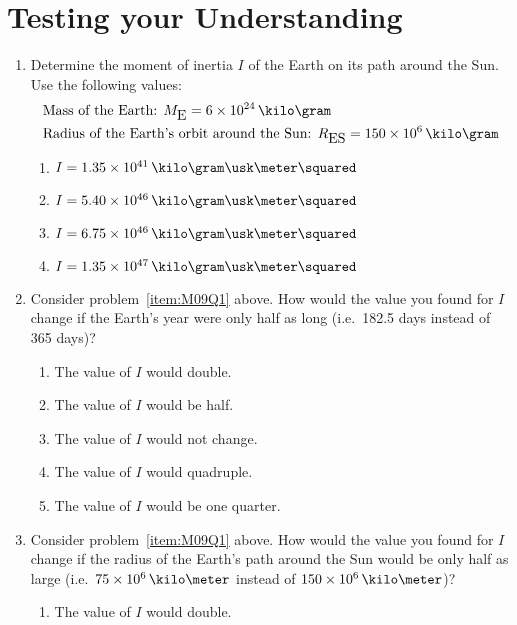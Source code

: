 
\section{Testing your Understanding}

\begin{enumerate}
\item \label{item:M09Q1} Determine the moment of inertia $I$ of the Earth on its path around the Sun. Use the following values:
  \begin{align*} %
    & \text{Mass of the Earth: } M_{\mbox{E}} = 6 \times 10^{24}\,\kilo\gram\\
    & \text{Radius of the Earth's orbit around the Sun: } R_{\mbox{ES}} = 150 \times 10^{6}\,\kilo\gram
  \end{align*}
  \begin{enumerate}
  \item $I = 1.35 \times 10^{41}\,\kilo\gram \usk \meter\squared$
  \item $I = 5.40 \times 10^{46}\,\kilo\gram \usk \meter\squared$
  \item $I = 6.75 \times 10^{46}\,\kilo\gram \usk \meter\squared$
  \item $I = 1.35 \times 10^{47}\,\kilo\gram \usk \meter\squared$
  \end{enumerate}
\item Consider problem~\ref{item:M09Q1} above. How would the value you found for $I$ change if the Earth's year were only half as long (i.e.\ 182.5 days instead of 365 days)?
  \begin{enumerate}
  \item The value of $I$ would double.
  \item The value of $I$ would be half.
  \item The value of $I$ would not change.
  \item The value of $I$ would quadruple.
  \item The value of $I$ would be one quarter.
  \end{enumerate}
\item Consider problem~\ref{item:M09Q1} above. How would the value you found for $I$ change if the radius of the Earth's path around the Sun would be only half as large (i.e.\ $75 \times 10^{6}\,\kilo\meter$ instead of $150 \times 10^{6}\,\kilo\meter$)?
  \begin{enumerate}
  \item The value of $I$ would double.

\end{enumerate}
\end{enumerate}
